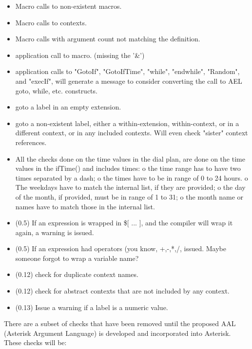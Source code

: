 {\begin{itemize}
    \item Macro calls to non-existent macros.
    \item Macro calls to contexts.
    \item Macro calls with argument count not matching the definition.
    \item application call to macro. (missing the '\&')
    \item application calls to "GotoIf", "GotoIfTime", "while",
      "endwhile", "Random", and "execIf", will generate a message to
      consider converting the call to AEL goto, while, etc. constructs.
    \item goto a label in an empty extension.
    \item goto a non-existent label, either a within-extension,
      within-context, or in a different context, or in any included
      contexts. Will even check "sister" context references.
    \item All the checks done on the time values in the dial plan, are
      done on the time values in the ifTime() and includes times:
          o the time range has to have two times separated by a dash;
          o the times have to be in range of 0 to 24 hours.
          o The weekdays have to match the internal list, if they are provided;
          o the day of the month, if provided, must be in range of 1 to 31;
          o the month name or names have to match those in the internal list.
    \item (0.5) If an expression is wrapped in \$[ ... ], and the compiler
      will wrap it again, a warning is issued.
    \item (0.5) If an expression had operators (you know,
      +,-,*,/,%
      issued. Maybe someone forgot to wrap a variable name?
    \item (0.12) check for duplicate context names.
    \item (0.12) check for abstract contexts that are not included by any context.
    \item (0.13) Issue a warning if a label is a numeric value.
\end{itemize}

There are a subset of checks that have been removed until the proposed
AAL (Asterisk Argument Language) is developed and incorporated into Asterisk.
These checks will be:

}
